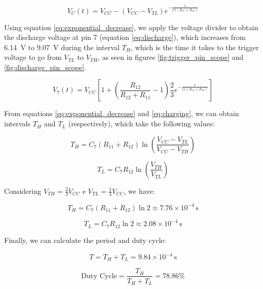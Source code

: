 \documentclass[lettersize,journal]{IEEEtran}
\begin{document}
\begin{equation}
V_C(t) = V_{CC} - (V_{CC} - V_{TL}) e^{-\frac{t}{C_7(R_{11} + R_{12})}}
\label{eq:exponential_decrease}
\end{equation}

Using equation \ref{eq:exponential_decrease}, we apply the voltage divider to obtain the discharge voltage at pin 7 (equation \ref{eq:discharge}), which increases from \SI{6.14}{\volt} to \SI{9.07}{\volt} during the interval \( T_H \), which is the time it takes to the trigger voltage to go from \( V_{TL} \) to \( V_{TH} \), as seen in figures \ref{fig:trigger_pin_scope} and \ref{fig:discharge_pin_scope}.

\begin{equation}
V_7(t) = V_{CC} \left[ 1 + \left( \frac{R_{12}}{R_{12} + R_{11}} - 1 \right) \frac{2}{3} e^{-\frac{t}{C_7(R_{11} + R_{12})}} \right]
\label{eq:discharge}
\end{equation}

From equations \ref{eq:exponential_decrease} and \ref{eq:charging}, we can obtain intervals \( T_H \) and  \( T_L \) (respectively), which take the following values:


\begin{equation}
T_H = C_7(R_{11} + R_{12}) \ln\left(\frac{V_{CC} - V_{TL}}{V_{CC} - V_{TH}}\right)
\end{equation}

\begin{equation}
T_L = C_7 R_{12}  \ln\left(\frac{V_{TH}}{V_{TL}}\right)
\end{equation}

Considering \( V_{TH} = \frac{2}{3}V_{CC} \) e \( V_{TL} = \frac{1}{3}V_{CC} \), we have:

\begin{equation}
T_H = C_7(R_{11} + R_{12})\ln 2 \approx 7.76 \times 10^{-4} \, \si{\second}
\end{equation}


\begin{equation}
T_L = C_7 R_{12} \ln 2 \approx 2.08 \times 10^{-4} \, \si{\second}
\end{equation}

Finally, we can calculate the period and duty cycle:

\begin{equation}
T = T_H + T_L = 9.84 \times 10^{-4} \, \si{\second}
\end{equation}

\begin{equation}
\text{Duty Cycle} = \frac{T_H}{T_H + T_L} = 78.86\%
\end{equation}
\end{document}
